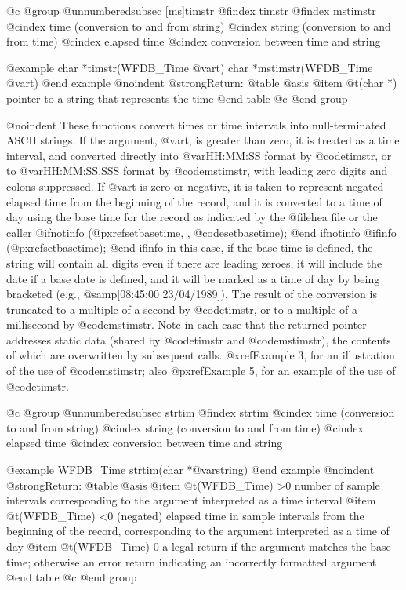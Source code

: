 {{{{{{{{@c @group
@unnumberedsubsec [ms]timstr
@findex timstr
@findex mstimstr
@cindex time (conversion to and from string)
@cindex string (conversion to and from time)
@cindex elapsed time
@cindex conversion between time and string

@example
char *timstr(WFDB_Time @var{t})
char *mstimstr(WFDB_Time @var{t})
@end example
@noindent
@strong{Return:}
@table @asis
@item @t{(char *)}
pointer to a string that represents the time
@end table
@c @end group

@noindent
These functions convert times or time intervals into null-terminated
ASCII strings.  If the argument, @var{t}, is greater than zero, it is
treated as a time interval, and converted directly into @var{HH:MM:SS}
format by @code{timstr}, or to @var{HH:MM:SS.SSS} format by
@code{mstimstr}, with leading zero digits and colons suppressed.  If
@var{t} is zero or negative, it is taken to represent negated elapsed
time from the beginning of the record, and it is converted to a time of
day using the base time for the record as indicated by the @file{hea}
file or the caller
@ifnotinfo
(@pxref{setbasetime, , @code{setbasetime}});
@end ifnotinfo
@ifinfo
(@pxref{setbasetime});
@end ifinfo
in this case, if the base time is defined, the string will contain all
digits even if there are leading zeroes, it will include the date if a
base date is defined, and it will be marked as a time of day by being
bracketed (e.g., @samp{[08:45:00 23/04/1989]}).  The result of the
conversion is truncated to a multiple of a second by @code{timstr}, or
to a multiple of a millisecond by @code{mstimstr}.  Note in each case
that the returned pointer addresses static data (shared by @code{timstr}
and @code{mstimstr}), the contents of which are overwritten by
subsequent calls.  @xref{Example 3}, for an illustration of the use of
@code{mstimstr}; also @pxref{Example 5}, for an example of the use of
@code{timstr}.

@c @group
@unnumberedsubsec strtim
@findex strtim
@cindex time (conversion to and from string)
@cindex string (conversion to and from time)
@cindex elapsed time
@cindex conversion between time and string

@example
WFDB_Time strtim(char *@var{string})
@end example
@noindent
@strong{Return:}
@table @asis
@item @t{(WFDB_Time) >0}
number of sample intervals corresponding to the argument interpreted as
a time interval
@item @t{(WFDB_Time) <0}
(negated) elapsed time in sample intervals from the beginning of the record,
corresponding to the argument interpreted as a time of day
@item @t{(WFDB_Time)  0}
a legal return if the argument matches the base time;  otherwise an error
return indicating an incorrectly formatted argument
@end table
@c @end group

}}}}}}}}

